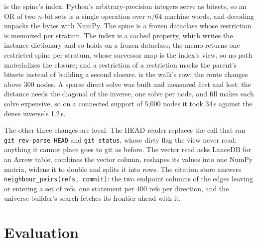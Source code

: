 \documentclass[11pt]{article}
\theoremstyle{plain}
\theoremstyle{definition}
\theoremstyle{remark}
\begin{document}
 is the spine's index. Python's arbitrary-precision integers serve as bitsets, so an
OR of two $n$-bit sets is a single operation over $n/64$ machine words, and decoding unpacks the
bytes with NumPy. The spine is a frozen dataclass whose restriction is memoized per stratum. The
index is a cached property, which writes the instance dictionary and so holds on a frozen dataclass;
the memo returns one restricted spine per stratum, whose successor map is the index's view, so no
path materializes the closure; and a restriction of a restriction masks the parent's bitsets instead
of building a second closure.  is the walk's row; the route changes above 300 nodes. A
sparse direct solve was built and measured first and
lost: the distance needs the diagonal of the inverse, one solve per node, and fill makes each solve
expensive, so on a connected support of 5{,}000 nodes it took 34\,s against the dense inverse's
1.2\,s.

The other three changes are local. The HEAD reader replaces the call that ran \texttt{git
rev-parse HEAD} and \texttt{git status}, whose dirty flag the view never read; anything it cannot
place goes to git as before. The vector read asks LanceDB for an Arrow table, combines the vector
column, reshapes its values into one NumPy matrix, widens it to double and splits it into rows. The
citation store answers \texttt{neighbour\_pairs(refs, commit)}: the two endpoint columns of the
edges leaving or entering a set of refs, one statement per 400 refs per direction, and the universe
builder's search fetches its frontier ahead with it.

\section{Evaluation}\label{sec:eval}
\end{document}
